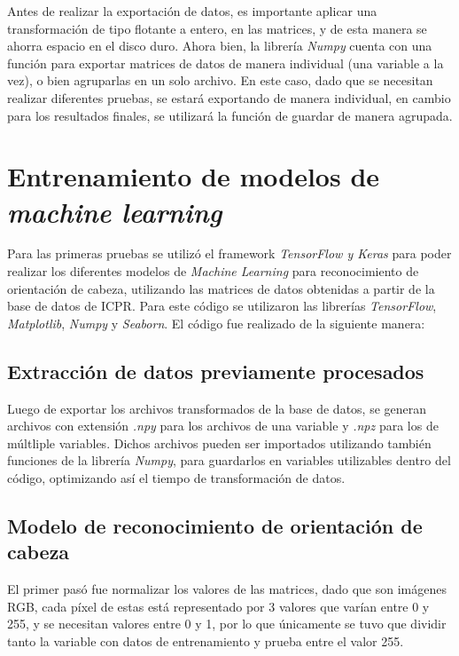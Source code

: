 Antes de realizar la exportación de datos, es importante aplicar una transformación de tipo flotante a entero, en las matrices, y de esta manera se ahorra espacio en el disco duro. Ahora bien, la librería \textit{Numpy} cuenta con una función para exportar matrices de datos de manera individual (una variable a la vez), o bien agruparlas en un solo archivo. En este caso, dado que se necesitan realizar diferentes pruebas, se estará exportando de manera individual, en cambio para los resultados finales, se utilizará la función de guardar de manera agrupada. 

\section{Entrenamiento de modelos de \textit{machine learning}}
Para las primeras pruebas se utilizó el framework \textit{TensorFlow y Keras} para poder realizar los diferentes modelos de \textit{Machine Learning} para reconocimiento de orientación de cabeza, utilizando las matrices de datos obtenidas a partir de la base de datos de ICPR. Para este código se utilizaron las librerías \textit{TensorFlow}, \textit{Matplotlib}, \textit{Numpy} y \textit{Seaborn}. El código fue realizado de la siguiente manera:

\subsection{Extracción de datos previamente procesados}
Luego de exportar los archivos transformados de la base de datos, se generan archivos con extensión \textit{.npy} para los archivos de una variable y \textit{.npz} para los de múltliple variables. Dichos archivos pueden ser importados utilizando también funciones de la librería \textit{Numpy}, para guardarlos en variables utilizables dentro del código, optimizando así el tiempo de transformación de datos.

\subsection{Modelo de reconocimiento de orientación de cabeza}
El primer pasó fue normalizar los valores de las matrices, dado que son imágenes RGB, cada píxel de estas está representado por 3 valores que varían entre 0 y 255, y se necesitan valores entre 0 y 1, por lo que únicamente se tuvo que dividir tanto la variable con datos de entrenamiento y prueba entre el valor 255. 

